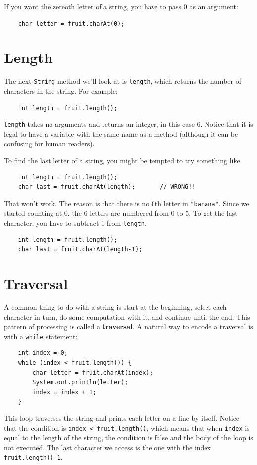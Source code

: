 \documentclass[12pt]{book}
\theoremstyle{exercise}
\begin{document}
If you want the zereoth letter of a string, you have to pass
0 as an argument:

\begin{lstlisting}
    char letter = fruit.charAt(0);
\end{lstlisting}


\section{Length}

The next {\tt String} method we'll look at is {\tt length}, which
returns the number of characters in the string.  For example:

\begin{lstlisting}
    int length = fruit.length();
\end{lstlisting}
%
{\tt length} takes no arguments
and returns an integer, in this case 6.  Notice that it is
legal to have a variable with the same name as a method (although
it can be confusing for human readers).

To find the last letter of a string, you might be tempted to
try something like

\begin{lstlisting}
    int length = fruit.length();
    char last = fruit.charAt(length);       // WRONG!!
\end{lstlisting}
%
That won't work.  The reason is that there is no 6th letter
in {\tt "banana"}.  Since we started counting at 0, the 6
letters are numbered from 0 to 5.  To get the last character,
you have to subtract 1 from {\tt length}.

\begin{lstlisting}
    int length = fruit.length();
    char last = fruit.charAt(length-1);
\end{lstlisting}


\section{Traversal}
\label{traverse}

A common thing to do with a string is
start at the beginning, select each character in turn, do
some computation with it, and continue until the end.  This pattern
of processing is called a {\bf traversal}.  A natural
way to encode a traversal is with a {\tt while} statement:

\begin{lstlisting}
    int index = 0;
    while (index < fruit.length()) {
        char letter = fruit.charAt(index);
        System.out.println(letter);
        index = index + 1;
    }
\end{lstlisting}
%
This loop traverses the string and prints each letter on
a line by itself.  Notice that the condition is
{\tt index < fruit.length()}, which means that when
{\tt index} is equal to the length of the string, the
condition is false and the body of the loop is not executed.
The last character we access is the one with the
index {\tt fruit.length()-1}.
\end{document}
